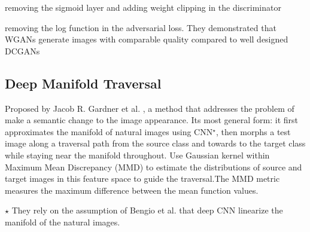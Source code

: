 \documentclass[letterpaper,12pt]{article}
\begin{document}
\begin{description}
\begin{enumerate*}[label={\roman*)},font={\color{red!50!black}\bfseries}]
\item removing the sigmoid layer and adding weight clipping in the discriminator
\item removing the log function in the adversarial loss. They demonstrated that WGANs generate images with comparable quality compared to well designed DCGANs
\end{enumerate*}
\end{description}

\subsection{Deep Manifold Traversal} Proposed by Jacob R. Gardner et al. \cite{deeptraverse}, a method that addresses the problem of make a semantic change to the image appearance. Its most general form: it first approximates the manifold of natural images using CNN\(^\star\), then morphs a test image along a traversal path from the source class and towards to the target class while staying near the manifold throughout. Use Gaussian kernel within Maximum Mean Discrepancy (MMD) to estimate the distributions of source and target images in this feature space to guide the traversal.The MMD metric measures the maximum difference between the mean function values.
 
\(\star\) They rely on the assumption of Bengio et al.\cite{pmlr-v28-bengio13} that deep CNN linearize the manifold of the natural images. 
\end{document}
